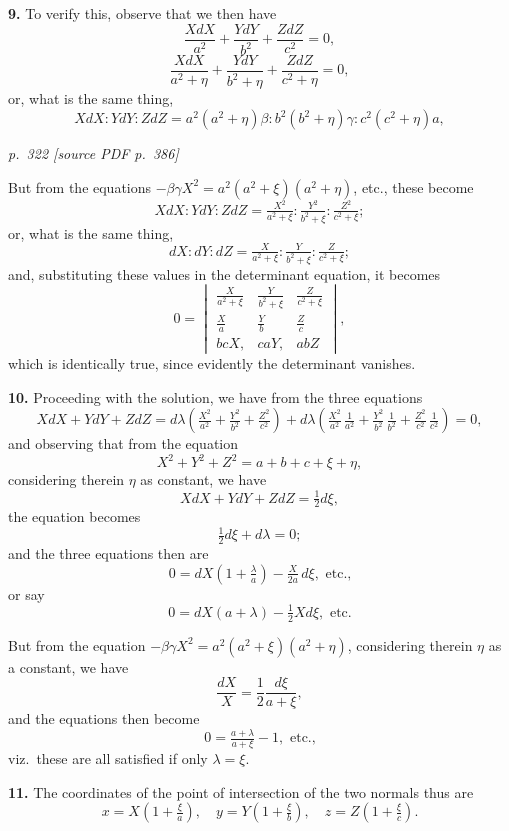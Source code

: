 \documentclass[11pt,a4paper]{article}
\newcommand{\pagemarker}[2]{\par\bigskip\noindent\textit{p.~#1 [source PDF p.~#2]}\par\smallskip}
\begin{document}
\textbf{9.} To verify this, observe that we then have
\[
\frac{X dX}{a^2} + \frac{Y dY}{b^2} + \frac{Z dZ}{c^2} = 0,
\]
\[
\frac{X dX}{a^2 + \eta} + \frac{Y dY}{b^2 + \eta} + \frac{Z dZ}{c^2 + \eta} = 0,
\]
or, what is the same thing,
\[
X dX : Y dY : Z dZ = a^2(a^2 + \eta)\beta : b^2(b^2 + \eta)\gamma : c^2(c^2 + \eta)a,
\]

\clearpage

\pagemarker{322}{386}

But from the equations $-\beta\gamma X^2 = a^2(a^2 + \xi)(a^2 + \eta)$, etc., these become
\[
X dX : Y dY : Z dZ = \tfrac{X^2}{a^2 + \xi} : \tfrac{Y^2}{b^2 + \xi} : \tfrac{Z^2}{c^2 + \xi};
\]
or, what is the same thing,
\[
dX : dY : dZ = \tfrac{X}{a^2 + \xi} : \tfrac{Y}{b^2 + \xi} : \tfrac{Z}{c^2 + \xi};
\]
and, substituting these values in the determinant equation, it becomes
\[
0 = \begin{vmatrix} \tfrac{X}{a^2 + \xi} & \tfrac{Y}{b^2 + \xi} & \tfrac{Z}{c^2 + \xi}\\
\tfrac{X}{a} & \tfrac{Y}{b} & \tfrac{Z}{c}\\
b cX, & caY, & abZ \end{vmatrix},
\]
which is identically true, since evidently the determinant vanishes.

\textbf{10.} Proceeding with the solution, we have from the three equations
\[
X dX + Y dY + Z dZ = d\lambda\!\left(\tfrac{X^2}{a^2} + \tfrac{Y^2}{b^2} + \tfrac{Z^2}{c^2}\right) + d\lambda\!\left(\tfrac{X^2}{a^2}\,\tfrac{1}{a^2} + \tfrac{Y^2}{b^2}\,\tfrac{1}{b^2} + \tfrac{Z^2}{c^2}\,\tfrac{1}{c^2}\right) = 0,
\]
and observing that from the equation
\[
X^2 + Y^2 + Z^2 = a + b + c + \xi + \eta,
\]
considering therein $\eta$ as constant, we have
\[
X dX + Y dY + Z dZ = \tfrac{1}{2}d\xi,
\]
the equation becomes
\[
\tfrac{1}{2}d\xi + d\lambda = 0;
\]
and the three equations then are
\[
0 = dX\left(1 + \tfrac{\lambda}{a}\right) - \tfrac{X}{2 a}\,d\xi, \text{ etc.,}
\]
or say
\[
0 = dX(a + \lambda) - \tfrac{1}{2}X d\xi, \text{ etc.}
\]

But from the equation $-\beta\gamma X^2 = a^2(a^2 + \xi)(a^2 + \eta)$, considering therein $\eta$ as a constant, we have
\[
\frac{dX}{X} = \frac{1}{2}\frac{d\xi}{a + \xi},
\]
and the equations then become
\[
0 = \tfrac{a + \lambda}{a + \xi} - 1, \text{ etc.,}
\]
viz.\ these are all satisfied if only $\lambda = \xi$.

\textbf{11.} The coordinates of the point of intersection of the two normals thus are
\[
x = X\left(1 + \tfrac{\xi}{a}\right),\quad y = Y\left(1 + \tfrac{\xi}{b}\right),\quad z = Z\left(1 + \tfrac{\xi}{c}\right).
\]
\end{document}
